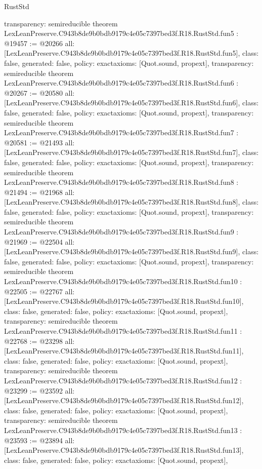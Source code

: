 \begin{lexlean}{RustStd}
\begin{coremodule}
{  transparency: semireducible
}
theorem LexLeanPreserve.C943b8de9b0bdb9179c4e05c7397bed3f.R18.RustStd.fun5 : @19457 := @20266 {
  all: [LexLeanPreserve.C943b8de9b0bdb9179c4e05c7397bed3f.R18.RustStd.fun5],
  class: false,
  generated: false,
  policy: exact{axioms: [Quot.sound, propext]},
  transparency: semireducible
}
theorem LexLeanPreserve.C943b8de9b0bdb9179c4e05c7397bed3f.R18.RustStd.fun6 : @20267 := @20580 {
  all: [LexLeanPreserve.C943b8de9b0bdb9179c4e05c7397bed3f.R18.RustStd.fun6],
  class: false,
  generated: false,
  policy: exact{axioms: [Quot.sound, propext]},
  transparency: semireducible
}
theorem LexLeanPreserve.C943b8de9b0bdb9179c4e05c7397bed3f.R18.RustStd.fun7 : @20581 := @21493 {
  all: [LexLeanPreserve.C943b8de9b0bdb9179c4e05c7397bed3f.R18.RustStd.fun7],
  class: false,
  generated: false,
  policy: exact{axioms: [Quot.sound, propext]},
  transparency: semireducible
}
theorem LexLeanPreserve.C943b8de9b0bdb9179c4e05c7397bed3f.R18.RustStd.fun8 : @21494 := @21968 {
  all: [LexLeanPreserve.C943b8de9b0bdb9179c4e05c7397bed3f.R18.RustStd.fun8],
  class: false,
  generated: false,
  policy: exact{axioms: [Quot.sound, propext]},
  transparency: semireducible
}
theorem LexLeanPreserve.C943b8de9b0bdb9179c4e05c7397bed3f.R18.RustStd.fun9 : @21969 := @22504 {
  all: [LexLeanPreserve.C943b8de9b0bdb9179c4e05c7397bed3f.R18.RustStd.fun9],
  class: false,
  generated: false,
  policy: exact{axioms: [Quot.sound, propext]},
  transparency: semireducible
}
theorem LexLeanPreserve.C943b8de9b0bdb9179c4e05c7397bed3f.R18.RustStd.fun10 : @22505 := @22767 {
  all: [LexLeanPreserve.C943b8de9b0bdb9179c4e05c7397bed3f.R18.RustStd.fun10],
  class: false,
  generated: false,
  policy: exact{axioms: [Quot.sound, propext]},
  transparency: semireducible
}
theorem LexLeanPreserve.C943b8de9b0bdb9179c4e05c7397bed3f.R18.RustStd.fun11 : @22768 := @23298 {
  all: [LexLeanPreserve.C943b8de9b0bdb9179c4e05c7397bed3f.R18.RustStd.fun11],
  class: false,
  generated: false,
  policy: exact{axioms: [Quot.sound, propext]},
  transparency: semireducible
}
theorem LexLeanPreserve.C943b8de9b0bdb9179c4e05c7397bed3f.R18.RustStd.fun12 : @23299 := @23592 {
  all: [LexLeanPreserve.C943b8de9b0bdb9179c4e05c7397bed3f.R18.RustStd.fun12],
  class: false,
  generated: false,
  policy: exact{axioms: [Quot.sound, propext]},
  transparency: semireducible
}
theorem LexLeanPreserve.C943b8de9b0bdb9179c4e05c7397bed3f.R18.RustStd.fun13 : @23593 := @23894 {
  all: [LexLeanPreserve.C943b8de9b0bdb9179c4e05c7397bed3f.R18.RustStd.fun13],
  class: false,
  generated: false,
  policy: exact{axioms: [Quot.sound, propext]},
}
\end{coremodule}
\end{lexlean}
